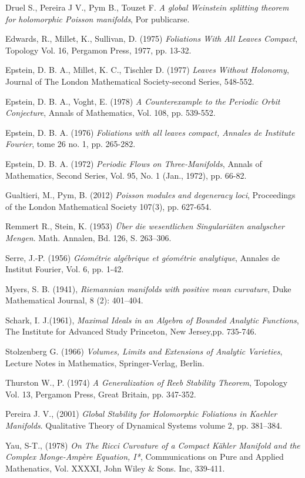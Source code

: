 \documentclass{article}
\begin{document}
\begin{thebibliography}{3}
Druel S., Pereira J V., Pym B., Touzet F. \textit{A global Weinstein splitting theorem for 
holomorphic Poisson manifolds}, Por publicarse.

 Edwards, R., Millet, K., Sullivan, D. (1975) \textit{Foliations
With All Leaves Compact}, Topology Vol. 16, Pergamon Press, 1977, pp. 13-32.

 Epstein, D. B. A., Millet, K. C., Tischler D.
(1977) \textit{Leaves Without Holonomy}, Journal of The London Mathematical Society-second Series, 548-552.

 Epstein, D. B. A., Voght, E. (1978) \textit{A Counterexample to the Periodic Orbit Conjecture}, 
Annals of Mathematics, Vol. 108, pp. 539-552. 

 Epstein, D. B. A. (1976) \textit{Foliations with all leaves compact, Annales de Institute Fourier},
tome 26 no. 1, pp. 265-282.

 Epstein, D. B. A. (1972) \textit{Periodic Flows on Three-Manifolds}, Annals of Mathematics,
Second Series, Vol. 95, No. 1 (Jan., 1972), pp. 66-82.

 Gualtieri, M., Pym, B. (2012) \textit{Poisson modules and degeneracy loci},
Proceedings of the London Mathematical Society 107(3), pp. 627-654.

 Remmert R., Stein, K. (1953) \textit{Über die wesentlichen
Singulariäten analyscher Mengen}. Math. Annalen, Bd. 126, S. 263--306.

 Serre, J.-P. (1956) \textit{G\'eom\'etrie alg\'ebrique et
g\'eom\'etrie analytique}, Annales de Institut Fourier, Vol. 6, pp. 1-42. 

 Myers, S. B. (1941), \textit{Riemannian manifolds with positive mean curvature}, Duke Mathematical Journal, 
8 (2): 401–404.

 Schark, I. J.(1961), \textit{Maximal Ideals in an Algebra of Bounded Analytic Functions}, The Institute for Advanced Study
Princeton, New Jersey,pp. 735-746.

 Stolzenberg G. (1966) \textit{Volumes, Limits and
Extensions of Analytic Varieties}, Lecture Notes in Mathematics,
Springer-Verlag, Berlin. 

 Thurston W., P. (1974) \textit{A Generalization of Reeb Stability Theorem}, Topology Vol. 13,
Pergamon Press, Great Britain, pp. 347-352.

 Pereira J. V., (2001) \textit{Global Stability for Holomorphic Foliations in Kaehler Manifolds}.
Qualitative Theory of Dynamical Systems volume 2, pp. 381–384.

 Yau, S-T., (1978) \textit{On The Ricci Curvature of a Compact K\"ahler Manifold and the Complex Monge-Amp\`ere Equation, I*},
Communications on Pure and Applied Mathenatics, Vol. XXXXI, John Wiley \& Sons. Inc, 339-411.
\end{thebibliography}
\end{document}
